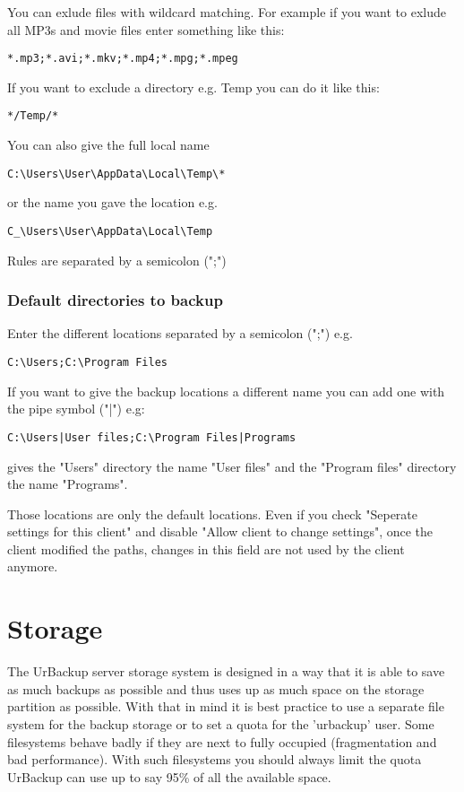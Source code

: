 \documentclass[a4paper,10pt]{article}
\begin{document}
You can exlude files with wildcard matching. For example if you want to exlude all MP3s and movie files enter something like this:
\begin{verbatim}
*.mp3;*.avi;*.mkv;*.mp4;*.mpg;*.mpeg
\end{verbatim}
If you want to exclude a directory e.g. Temp you can do it like this:
\begin{verbatim}
*/Temp/*
\end{verbatim}
You can also give the full local name
\begin{verbatim}
C:\Users\User\AppData\Local\Temp\*
\end{verbatim}
or the name you gave the location e.g.
\begin{verbatim}
C_\Users\User\AppData\Local\Temp
\end{verbatim}

Rules are separated by a semicolon (";")

\subsubsection{Default directories to backup}
\label{subsub_default_dirs}

Enter the different locations separated by a semicolon (";") e.g.
\begin{verbatim}
C:\Users;C:\Program Files
\end{verbatim}
If you want to give the backup locations a different name you can add one with the pipe symbol ("|") e.g:
\begin{verbatim}
C:\Users|User files;C:\Program Files|Programs
\end{verbatim}
gives the "Users" directory the name "User files" and the "Program files" directory the name "Programs".

Those locations are only the default locations. Even if you check "Seperate settings for this client" and disable "Allow client to change settings", once the client modified the paths, changes in this field are not used by the client anymore.


\section{Storage}

The UrBackup server storage system is designed in a way that it is able to save as much backups as possible and thus uses up as much space on the storage partition as possible. With that in mind it is best practice to use a separate file system for the backup storage or to set a quota for the 'urbackup' user. Some filesystems behave badly if they are next to fully occupied (fragmentation and bad performance). With such filesystems you should always limit the quota UrBackup can use up to say 95\% of all the available space.
\end{document}
